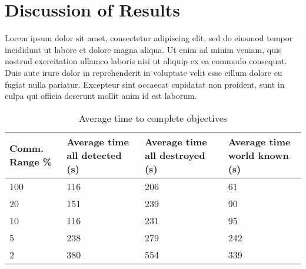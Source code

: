 \chapter{Discussion of Results}
Lorem ipsum dolor sit amet, consectetur adipiscing elit, sed do eiusmod tempor incididunt ut labore et dolore magna aliqua. Ut enim ad minim veniam, quis nostrud exercitation ullamco laboris nisi ut aliquip ex ea commodo consequat. Duis aute irure dolor in reprehenderit in voluptate velit esse cillum dolore eu fugiat nulla pariatur. Excepteur sint occaecat cupidatat non proident, sunt in culpa qui officia deserunt mollit anim id est laborum.



\begin{table}[h]
	\caption{Average time to complete objectives}
	\centering
	\label{tab:avgResults}
		\begin{tabular}{|p{1.25cm}|p{1.5cm}|p{1.75cm}|p{1.5cm}|}
		\hline
		Comm. Range \% & Average time all detected (s) & Average time all destroyed (s) & Average time world known (s)\\
		\hline
			100 & 116 & 206 & 61  \\ \hline
			 20 & 151 & 239 & 90  \\ \hline
			 10 & 116 & 231 & 95  \\ \hline
			  5 & 238 & 279 & 242 \\ \hline
			  2 & 380 & 554 & 339 \\ \hline
	\end{tabular}
\end{table}
